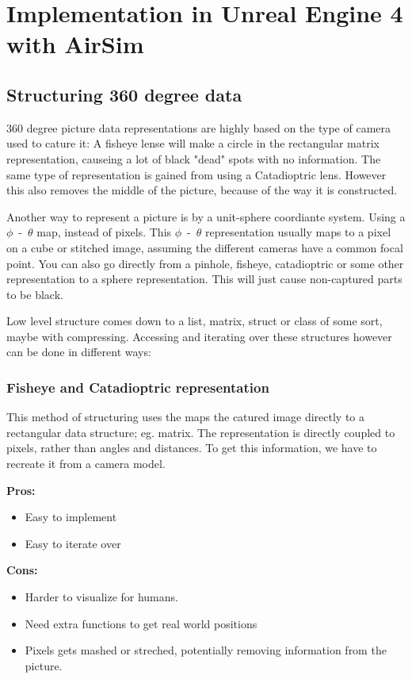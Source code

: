 
\chapter{Implementation in Unreal Engine 4 with AirSim}

\section{Structuring 360 degree data}
360 degree picture data representations are highly based on the type of camera used to cature it: A fisheye lense will make a circle in the rectangular matrix representation, causeing a lot of black "dead" spots with no information. The same type of representation is gained from using a Catadioptric lens. However this also removes the middle of the picture, because of the way it is constructed.

Another way to represent a picture is by a unit-sphere coordiante system. Using a $\phi$~-~$\theta$ map, instead of pixels. This $\phi$~-~$\theta$ representation usually maps to a pixel on a cube or stitched image, assuming the different cameras have a common focal point. You can also go directly from a pinhole, fisheye, catadioptric or some other representation to a sphere representation. This will just cause non-captured parts to be black.

Low level structure comes down to a list, matrix, struct or class of some sort, maybe with compressing. Accessing and iterating over these structures however can be done in different ways: 

\subsection{Fisheye and Catadioptric representation}
This method of structuring uses the maps the catured image directly to a rectangular data structure; eg. matrix. The representation is directly coupled to pixels, rather than angles and distances. To get this information, we have to recreate it from a camera model.

\textbf{Pros:}
\begin{itemize}
    \item Easy to implement
    \item Easy to iterate over
\end{itemize}

\textbf{Cons:}
\begin{itemize}
    \item Harder to visualize for humans. 
    \item Need extra functions to get real world positions
    \item Pixels gets mashed or streched, potentially removing information from the picture.
\end{itemize}

